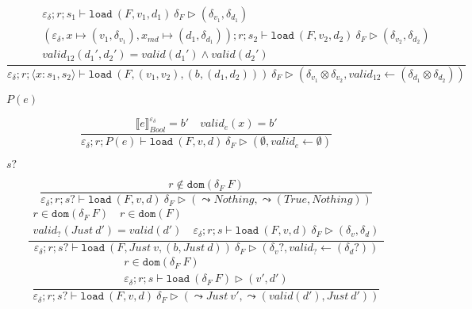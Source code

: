 \documentclass{report}
\theoremstyle{theorem}
\begin{document}
\begin{displaymath}
	\frac{\begin{array}{c}
		\varepsilon_\delta ; r ; s_1 \vdash \mathtt{load}~ (F,v_1,d_1)~ \delta_F \rhd (\delta_{v_1},\delta_{d_1})\\
		(\varepsilon_\delta,x \mapsto (v_1,\delta_{v_1}),x_{md} \mapsto (d_1,\delta_{d_1})) ; r ; s_2 \vdash \mathtt{load}~ (F,v_2,d_2)~ \delta_F \rhd (\delta_{v_2},\delta_{d_2})\\
		valid_{12}({d_1}',{d_2}') = valid({d_1}') \wedge valid({d_2}')
	\end{array}}
	{\varepsilon_\delta ; r ; \langle x:s_1,s_2 \rangle \vdash \mathtt{load}~ (F,(v_1,v_2),(b,(d_1,d_2)))~ \delta_F \rhd (\delta_{v_1} \otimes \delta_{v_2},valid_{12} \leftarrow (\delta_{d_1} \otimes \delta_{d_2})) }
\end{displaymath}

$\boxed{P(e)}$

\begin{displaymath}
	\frac{\llbracket e \rrbracket^{\varepsilon_\delta}_{Bool} = b' \quad valid_e(x) = b'}
	{\varepsilon_\delta ; r ; P(e) \vdash \mathtt{load}~ (F,v,d)~ \delta_F \rhd (\emptyset,valid_e \leftarrow \emptyset)}
\end{displaymath}

$\boxed{s?}$

\begin{displaymath}
	\frac{r \notin \mathtt{dom}(\delta_F~F)}
	{\varepsilon_\delta ; r ; s? \vdash \mathtt{load}~ (F,v,d)~ \delta_F \rhd (\leadsto Nothing,\leadsto (True,Nothing))}
\end{displaymath}
\begin{displaymath}
	\frac{\begin{array}{c}
		r \in \mathtt{dom}(\delta_F~F) \quad r \in \mathtt{dom}(F)\\
		valid_?(Just~d') = valid(d')\quad
		\varepsilon_\delta ; r ; s \vdash \mathtt{load}~ (F,v,d)~ \delta_F \rhd (\delta_v,\delta_d)
	\end{array}}
	{\varepsilon_\delta ; r ; s? \vdash \mathtt{load}~ (F,Just ~v,(b,Just ~d))~ \delta_F \rhd (\delta_v?,valid_? \leftarrow (\delta_d?))}
\end{displaymath}
\begin{displaymath}
	\frac{\begin{array}{c}
		r \in \mathtt{dom}(\delta_F~F) \\
		\varepsilon_\delta ; r ; s \vdash \mathtt{load}~ (\delta_F~F) \rhd (v',d')
	\end{array}}
	{\varepsilon_\delta ; r ; s? \vdash \mathtt{load}~ (F,v,d)~ \delta_F \rhd (\leadsto Just~v',\leadsto (valid(d'),Just~d'))}
\end{displaymath}
\end{document}
